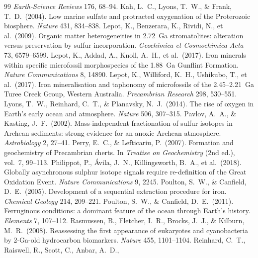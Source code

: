 \documentclass[11pt]{article}
\begin{document}
\begin{thebibliography}{99}
\textit{Earth-Science Reviews} 176, 68--94.
 Kah, L.~C., Lyons, T.~W., \& Frank, T.~D.\ (2004). Low marine
sulfate and protracted oxygenation of the Proterozoic biosphere. \textit{Nature} 431, 834--838.
 Lepot, K., Benzerara, K., Rividi, N., et al.\ (2009). Organic
matter heterogeneities in 2.72~Ga stromatolites: alteration versus preservation by sulfur
incorporation. \textit{Geochimica et Cosmochimica Acta} 73, 6579--6599.
 Lepot, K., Addad, A., Knoll, A.~H., et al.\ (2017). Iron
minerals within specific microfossil morphospecies of the 1.88~Ga Gunflint Formation. \textit{Nature
Communications} 8, 14890.
 Lepot, K., Williford, K.~H., Ushikubo, T., et al.\ (2017).
Iron mineralisation and taphonomy of microfossils of the 2.45--2.21~Ga Turee Creek Group, Western
Australia. \textit{Precambrian Research} 298, 530--551.
 Lyons, T.~W., Reinhard, C.~T., \& Planavsky, N.~J.\ (2014).
The rise of oxygen in Earth's early ocean and atmosphere. \textit{Nature} 506, 307--315.
 Pavlov, A.~A., \& Kasting, J.~F.\ (2002).
Mass-independent fractionation of sulfur isotopes in Archean sediments: strong evidence for an anoxic
Archean atmosphere. \textit{Astrobiology} 2, 27--41.
 Perry, E.~C., \& Lefticariu, P.\ (2007). Formation and
geochemistry of Precambrian cherts. In \textit{Treatise on Geochemistry} (2nd ed.), vol.~7, 99--113.
 Philippot, P., \'{A}vila, J.~N., Killingsworth, B.~A.,
et al.\ (2018). Globally asynchronous sulphur isotope signals require re-definition of the Great
Oxidation Event. \textit{Nature Communications} 9, 2245.
 Poulton, S.~W., \& Canfield, D.~E.\ (2005).
Development of a sequential extraction procedure for iron. \textit{Chemical Geology} 214, 209--221.
 Poulton, S.~W., \& Canfield, D.~E.\ (2011).
Ferruginous conditions: a dominant feature of the ocean through Earth's history. \textit{Elements} 7,
107--112.
 Rasmussen, B., Fletcher, I.~R., Brocks, J.~J., \&
Kilburn, M.~R.\ (2008). Reassessing the first appearance of eukaryotes and cyanobacteria by
2-Ga-old hydrocarbon biomarkers. \textit{Nature} 455, 1101--1104.
 Reinhard, C.~T., Raiswell, R., Scott, C., Anbar, A.~D.,

\end{thebibliography}
\end{document}
